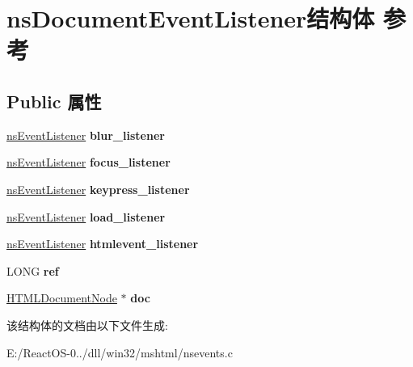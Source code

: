 \hypertarget{structns_document_event_listener}{}\section{ns\+Document\+Event\+Listener结构体 参考}
\label{structns_document_event_listener}
\subsection*{Public 属性}
\begin{DoxyCompactItemize}
\item 
\mbox{\label{structns_document_event_listener_a04ab1685c4a23a8d712922d5854e7f4e}} 
\hyperlink{structns_event_listener}{ns\+Event\+Listener} {\bfseries blur\+\_\+listener}
\item 
\mbox{\label{structns_document_event_listener_af16de8f7b78adcdb1c2cd31a933ad433}} 
\hyperlink{structns_event_listener}{ns\+Event\+Listener} {\bfseries focus\+\_\+listener}
\item 
\mbox{\label{structns_document_event_listener_a5e68b93faa8668fcffb79569f660ea30}} 
\hyperlink{structns_event_listener}{ns\+Event\+Listener} {\bfseries keypress\+\_\+listener}
\item 
\mbox{\label{structns_document_event_listener_ad50cc303b4fd3ee19f2f708ef8d92c79}} 
\hyperlink{structns_event_listener}{ns\+Event\+Listener} {\bfseries load\+\_\+listener}
\item 
\mbox{\label{structns_document_event_listener_a6190af99b3c6982c15325388c8b466cb}} 
\hyperlink{structns_event_listener}{ns\+Event\+Listener} {\bfseries htmlevent\+\_\+listener}
\item 
\mbox{\label{structns_document_event_listener_a8c6e4a12da3ad6d96cc26ea3a167565d}} 
L\+O\+NG {\bfseries ref}
\item 
\mbox{\label{structns_document_event_listener_a16fdc908f23fbb0194a3291f7e21b6bb}} 
\hyperlink{struct_h_t_m_l_document_node}{H\+T\+M\+L\+Document\+Node} $\ast$ {\bfseries doc}
\end{DoxyCompactItemize}


该结构体的文档由以下文件生成\+:\begin{DoxyCompactItemize}
\item 
E\+:/\+React\+O\+S-\/0../dll/win32/mshtml/nsevents.\+c\end{DoxyCompactItemize}
